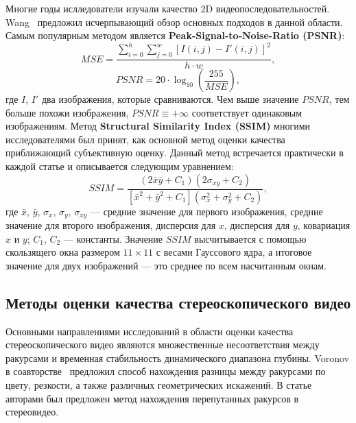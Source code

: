 \documentclass[14pt, a4paper]{extarticle}
\begin{document}
Многие годы ислледователи изучали качество 2D видеопоследовательностей. 
Wang~\cite{wang2006survey} предложил исчерпывающий обзор основных подходов в данной области.
Самым популярным методом является \textbf{Peak-Signal-to-Noise-Ratio (PSNR)}:
\begin{equation*}
	MSE = \frac{\sum_{i=0}^{h}\sum_{j=0}^{w}[I(i, j) - I'(i, j)]^2}{h \cdot w},
\end{equation*}
\begin{equation}
	PSNR = 20 \cdot \log_{10}(\frac{255}{MSE}),
\end{equation}
где $I$, $I'$ два изображения, которые сравниваются. Чем выше значение $PSNR$, 
тем больше похожи изображения, $PSNR \equiv +\infty$ соответствует одинаковым изображениям. 
Метод \textbf{Structural Similarity Index (SSIM)} многими исследователями был принят, 
как основной метод оценки качества приближающий субъективную оценку. Данный метод встречается
практически в каждой статье и описывается следующим уравнением:
\begin{equation}
	SSIM = \frac{(2\bar{x}\bar{y} + C_1)(2\sigma_{xy} + C_	2)}{[\bar{x}^2 + \bar{y}^2 + C_1](\sigma_x^2 + \sigma_y^2 + C_2)},
\end{equation} 
где $\bar{x}$, $\bar{y}$, $\sigma_x$, $\sigma_y$, $\sigma_{xy}$ --- средние значение 
для первого изображения, средние значение для второго изображения, дисперсия для $x$, 
дисперсия для $y$, ковариация $x$ и $y$; $C_1$, $C_2$ --- константы. Значение $SSIM$ 
высчитывается с помощью скользящего окна размером $11 \times 11$ с весами Гауссового ядра, 
а итоговое значение для двух изображений --- это среднее по всем насчитанным окнам.

\subsection{Методы оценки качества стереоскопического видео}

Основными направлениями исследований в области оценки качества стереоскопического видео 
являются множественные несоответствия между ракурсами и временная стабильность 
динамического диапазона глубины. Voronov в соавторстве~\cite{voronov2012towards} предложил
способ нахождения разницы между ракурсами по цвету, резкости, 
а также различных геометрических искажений. В статье~\cite{akimov2012automatic} авторами 
был предложен метод нахождения перепутанных ракурсов в стереовидео. 
\end{document}
